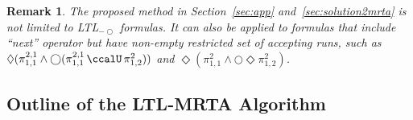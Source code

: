 \documentclass[Afour,sageh,times]{sagej}
\newtheorem{rem}[thm]{Remark}
\newcommand{\ltl}{ {\it LTL}$_{-\bigcirc}$ }
\renewcommand{\ap}[3]{\mathcal{\pi}_{{#1},{#2}}^{#3}}
\begin{document}
\begin{rem}
The proposed method in Section~\ref{sec:app} and~\ref{sec:solution2mrta} is not limited to  LTL$_{-\bigcirc}$ formulas. It can also be applied to  formulas that include ``next'' operator but have non-empty restricted set of accepting runs, such as $\Diamond(\ap{1}{1}{2,1} \wedge \bigcirc (\ap{1}{1}{2,1} \,\ccalU\, \ap{1}{2}{2}))$ and $\Diamond (\ap{1}{1}{2}  \wedge \bigcirc \Diamond \ap{1}{2}{2})$.
\end{rem}

\subsection{Outline of the LTL-MRTA Algorithm}
\end{document}

